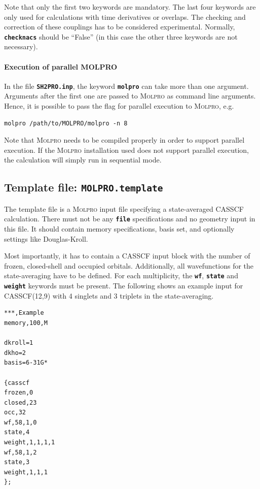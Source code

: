 \documentclass[a4paper,11pt,DIV=15,openany,twoside=false]{scrbook}
\newcommand{\ttt}[1]{\textbf{\texttt{#1}}}
\newenvironment{example}{
  \vspace{0mm}
  \definecolor{shadecolor}{HTML}{E4F4FF}
  \begin{shaded}
}{
  \end{shaded}
}
\begin{document}
Note that only the first two keywords are mandatory. The last four keywords are only used for calculations with time derivatives or overlaps. The checking and correction of these couplings has to be considered experimental. Normally, \ttt{checknacs} should be ``False'' (in this case the other three keywords are not necessary).

\paragraph{Execution of parallel MOLPRO}

In the file \ttt{SH2PRO.inp}, the keyword \ttt{molpro} can take more than one argument. Arguments after the first one are passed to \textsc{Molpro} as command line arguments. Hence, it is possible to pass the flag for parallel execution to \textsc{Molpro}, e.g.
\begin{example}
  \begin{verbatim}
molpro /path/to/MOLPRO/molpro -n 8
  \end{verbatim}
\end{example}
Note that \textsc{Molpro} needs to be compiled properly in order to support parallel execution. If the \textsc{Molpro} installation used does not support parallel execution, the calculation will simply run in sequential mode.

\subsection{Template file: \ttt{MOLPRO.template}}

The template file is a \textsc{Molpro} input file specifying a state-averaged CASSCF calculation. There must not be any \ttt{file} specifications and no geometry input in this file. It should contain memory specifications, basis set, and optionally settings like Douglas-Kroll.

Most importantly, it has to contain a CASSCF input block with the number of frozen, closed-shell and occupied orbitals. Additionally, all wavefunctions for the state-averaging have to be defined. For each multiplicity, the \ttt{wf}, \ttt{state} and \ttt{weight} keywords must be present. The following shows an example input for CASSCF(12,9) with 4 singlets and 3 triplets in the state-averaging.
\begin{example}
  \begin{verbatim}
***,Example
memory,100,M

dkroll=1
dkho=2
basis=6-31G*

{casscf
frozen,0
closed,23
occ,32
wf,58,1,0
state,4
weight,1,1,1,1
wf,58,1,2
state,3
weight,1,1,1
};
  \end{verbatim}
\end{example}
\end{document}
